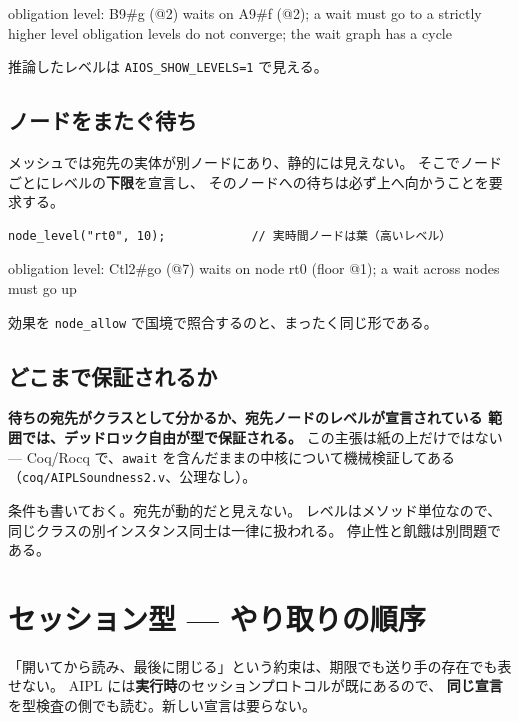 \documentclass[11pt,a4paper]{ltjsarticle}
\begin{document}
\begin{term}
obligation level: B9#g (@2) waits on A9#f (@2);
                  a wait must go to a strictly higher level
obligation levels do not converge; the wait graph has a cycle
\end{term}

推論したレベルは \texttt{AIOS\_SHOW\_LEVELS=1} で見える。

\subsection{ノードをまたぐ待ち}

メッシュでは宛先の実体が別ノードにあり、静的には見えない。
そこでノードごとにレベルの\textbf{下限}を宣言し、
そのノードへの待ちは必ず上へ向かうことを要求する。

\begin{lstlisting}
node_level("rt0", 10);            // 実時間ノードは葉（高いレベル）
\end{lstlisting}

\begin{term}
obligation level: Ctl2#go (@7) waits on node rt0 (floor @1);
                  a wait across nodes must go up
\end{term}

効果を \texttt{node\_allow} で国境で照合するのと、まったく同じ形である。

\subsection{どこまで保証されるか}

\textbf{待ちの宛先がクラスとして分かるか、宛先ノードのレベルが宣言されている
範囲では、デッドロック自由が型で保証される。}
この主張は紙の上だけではない ---
Coq/Rocq で、\texttt{await} を含んだままの中核について機械検証してある
（\texttt{coq/AIPLSoundness2.v}、公理なし）。

条件も書いておく。宛先が動的だと見えない。
レベルはメソッド単位なので、同じクラスの別インスタンス同士は一律に扱われる。
停止性と飢餓は別問題である。

\section{セッション型 --- やり取りの順序}
\label{sec:session}

「開いてから読み、最後に閉じる」という約束は、期限でも送り手の存在でも表せない。
AIPL には\textbf{実行時}のセッションプロトコルが既にあるので、
\textbf{同じ宣言}を型検査の側でも読む。新しい宣言は要らない。
\end{document}
